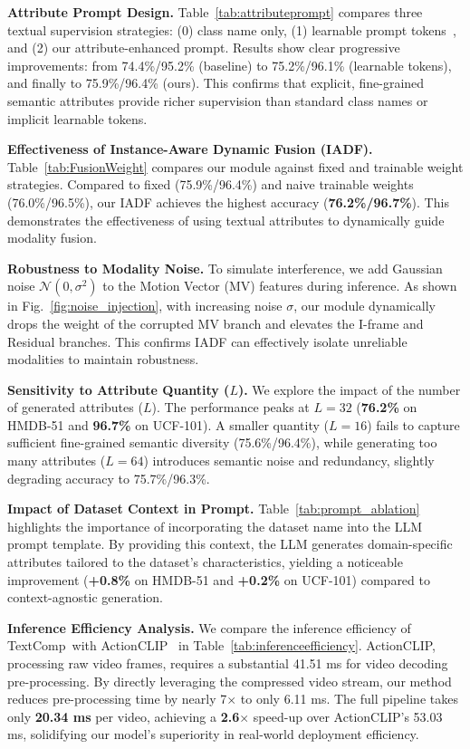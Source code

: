 \documentclass[letterpaper]{article} %
\newcommand{\methodname}{TextComp}
\begin{document}
\noindent\textbf{Attribute Prompt Design.} Table~\ref{tab:attributeprompt} compares three textual supervision strategies: (0) class name only, (1) learnable prompt tokens~\cite{zhou2022learning}, and (2) our attribute-enhanced prompt. Results show clear progressive improvements: from 74.4\%/95.2\% (baseline) to 75.2\%/96.1\% (learnable tokens), and finally to 75.9\%/96.4\% (ours). This confirms that explicit, fine-grained semantic attributes provide richer supervision than standard class names or implicit learnable tokens.

\noindent\textbf{Effectiveness of Instance-Aware Dynamic Fusion (IADF).} Table~\ref{tab:FusionWeight} compares our module against fixed and trainable weight strategies. Compared to fixed (75.9\%/96.4\%) and naive trainable weights (76.0\%/96.5\%), our IADF achieves the highest accuracy (\textbf{76.2\%/96.7\%}). This demonstrates the effectiveness of using textual attributes to dynamically guide modality fusion.

\noindent\textbf{Robustness to Modality Noise.} To simulate interference, we add Gaussian noise $\mathcal{N}(0, \sigma^2)$ to the Motion Vector (MV) features during inference. As shown in Fig.~\ref{fig:noise_injection}, with increasing noise $\sigma$, our module dynamically drops the weight of the corrupted MV branch and elevates the I-frame and Residual branches. This confirms IADF can effectively isolate unreliable modalities to maintain robustness.

\noindent\textbf{Sensitivity to Attribute Quantity ($L$).} We explore the impact of the number of generated attributes ($L$). The performance peaks at $L=32$ (\textbf{76.2\%} on HMDB-51 and \textbf{96.7\%} on UCF-101). A smaller quantity ($L=16$) fails to capture sufficient fine-grained semantic diversity (75.6\%/96.4\%), while generating too many attributes ($L=64$) introduces semantic noise and redundancy, slightly degrading accuracy to 75.7\%/96.3\%.

\noindent\textbf{Impact of Dataset Context in Prompt.} Table~\ref{tab:prompt_ablation} highlights the importance of incorporating the dataset name into the LLM prompt template. By providing this context, the LLM generates domain-specific attributes tailored to the dataset's characteristics, yielding a noticeable improvement (\textbf{+0.8\%} on HMDB-51 and \textbf{+0.2\%} on UCF-101) compared to context-agnostic generation.

\noindent\textbf{Inference Efficiency Analysis.} We compare the inference efficiency of \methodname~with ActionCLIP~\cite{wang2021actionclipnewparadigmvideo} in Table~\ref{tab:inferenceefficiency}. ActionCLIP, processing raw video frames, requires a substantial 41.51 ms for video decoding pre-processing. By directly leveraging the compressed video stream, our method reduces pre-processing time by nearly 7$\times$ to only 6.11 ms. The full pipeline takes only \textbf{20.34 ms} per video, achieving a \textbf{2.6$\times$} speed-up over ActionCLIP's 53.03 ms, solidifying our model's superiority in real-world deployment efficiency.
\end{document}
